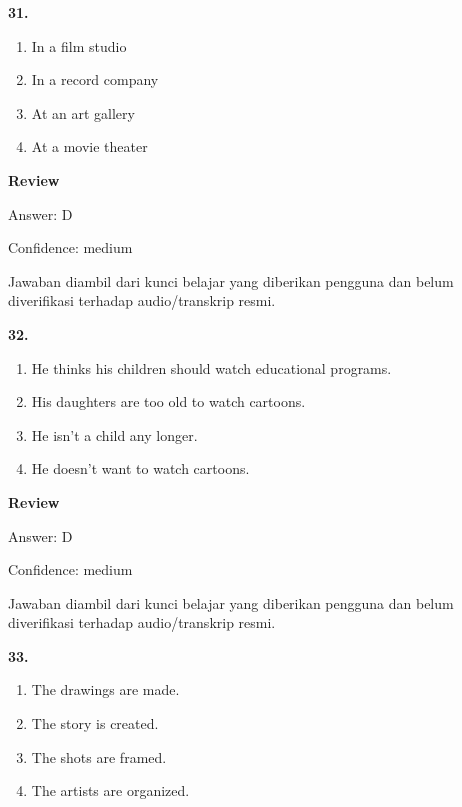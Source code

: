 \documentclass[12pt]{article}
\begin{document}
\noindent\textbf{31.}
\begin{enumerate}[label=(\Alph*),leftmargin=*,itemsep=0.2em]
\item In a film studio
\item In a record company
\item At an art gallery
\item At a movie theater
\end{enumerate}
\par
\begingroup
\setlength{\parskip}{0pt}
\setlength{\parindent}{0pt}
\textbf{Review}\par
Answer: D\par
Confidence: medium\par
Jawaban diambil dari kunci belajar yang diberikan pengguna dan belum diverifikasi terhadap audio/transkrip resmi.\par
\endgroup
\par
\vspace{0.25\baselineskip}
\noindent\textbf{32.}
\begin{enumerate}[label=(\Alph*),leftmargin=*,itemsep=0.2em]
\item He thinks his children should watch educational programs.
\item His daughters are too old to watch cartoons.
\item He isn't a child any longer.
\item He doesn't want to watch cartoons.
\end{enumerate}
\par
\begingroup
\setlength{\parskip}{0pt}
\setlength{\parindent}{0pt}
\textbf{Review}\par
Answer: D\par
Confidence: medium\par
Jawaban diambil dari kunci belajar yang diberikan pengguna dan belum diverifikasi terhadap audio/transkrip resmi.\par
\endgroup
\par
\vspace{0.25\baselineskip}
\noindent\textbf{33.}
\begin{enumerate}[label=(\Alph*),leftmargin=*,itemsep=0.2em]
\item The drawings are made.
\item The story is created.
\item The shots are framed.
\item The artists are organized.
\end{enumerate}
\par
\end{document}

